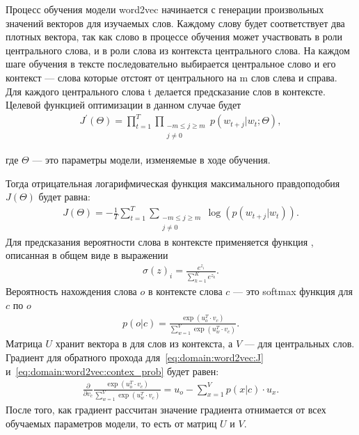 Процесс обучения модели word2vec начинается с генерации произвольных значений векторов для изучаемых слов. Каждому слову будет соответствует два плотных вектора, так как слово в процессе обучения может участвовать в роли центрального слова, и в роли слова из контекста центрального слова. На каждом шаге обучения в тексте последовательно выбирается центральное слово и его контекст --- слова которые отстоят от центрального на m слов слева и справа. Для каждого центрального слова t делается предсказание слов в контексте\cite{word2vec}. Целевой функцией оптимизации в данном случае будет
\begin{gather}
  J^{\prime}(\Theta) = \prod_{t=1}^{T}\prod_{\substack{-m\leq j \geq m\\j \neq 0}}p(w_{t+j}|w_{t};\Theta),
\end{gather}
\begin{explanationx}
\item [где] $ \Theta $ --- это параметры модели, изменяемые в ходе обучения.
\end{explanationx}

Тогда отрицательная логарифмическая функция максимального правдоподобия $ J(\Theta) $ будет равна:
\begin{gather}
  \label{eq:domain:word2vec:J}
  J(\Theta) = -\frac{1}{T}\sum_{t=1}^{T}\sum_{\substack{-m\leq j \geq m\\j \neq 0}}\log(p(w_{t+j}|w_{t})).
\end{gather}
Для предсказания вероятности слова в контексте применяется функция , описанная в общем виде в выражении
\begin{gather}
  \label{eq:domain:softmax}
  {\sigma(z)}_i = \frac{e^{z_i}}{\sum_{k=1}^{K}e^{z_k}}.
\end{gather}
Вероятность нахождения слова $o$ в контексте слова $c$ --- это softmax функция для $c$ по $o$
\begin{gather}\label{eq:domain:word2vec:contex_prob}
  p(o|c) = \frac{\exp({u_{o}^T}\cdot{v_{c}})}{\sum_{w=1}^{V}\exp({u_w^T}\cdot{v_{c}})}.
\end{gather}
Матрица $U$ хранит вектора в для слов из контекста, а $V$ --- для центральных слов.
Градиент для обратного прохода для~\ref{eq:domain:word2vec:J} и~\ref{eq:domain:word2vec:contex_prob} будет равен:
\begin{gather}
  \frac{\partial }{\partial v_c}\frac{\exp({u_{o}^T}\cdot{v_{c}})}{\sum_{w=1}^{V}\exp({u_w^T}\cdot{v_{c}})} = u_o - \sum_{x=1}^{V}p(x|c)\cdot{u_x}.
\end{gather}
После того, как градиент рассчитан значение градиента отнимается от всех обучаемых параметров модели, то есть от матриц $U$ и $V$.


